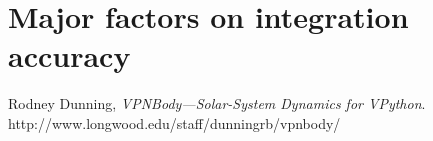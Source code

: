 \documentclass[11pt]{article}
\begin{document}
\section{Major factors on integration accuracy}

\begin{thebibliography}{9}
Rodney Dunning, \emph{VPNBody---Solar-System Dynamics for VPython}.\\ http://www.longwood.edu/staff/dunningrb/vpnbody/
\end{thebibliography}
\end{document}
